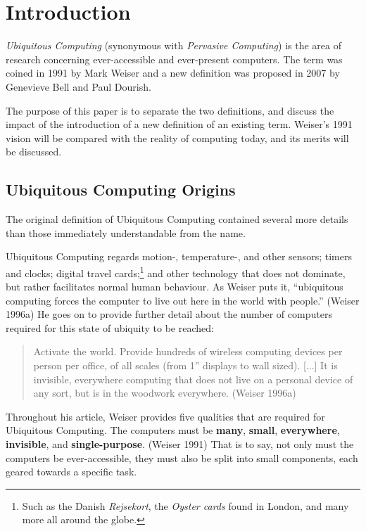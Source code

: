 \section{Introduction}

\emph{Ubiquitous Computing} (synonymous with \emph{Pervasive Computing}) is the area of research concerning
ever-accessible and ever-present computers. The term was coined in 1991 by Mark Weiser and a new definition
was proposed in 2007 by Genevieve Bell and Paul Dourish.

The purpose of this paper is to separate the two definitions, and discuss the impact of the introduction of a
new definition of an existing term. Weiser's 1991 vision will be compared with the reality of computing today,
and its merits will be discussed.

\subsection*{Ubiquitous Computing Origins}

The original definition of Ubiquitous Computing contained several more details than those immediately
understandable from the name.

Ubiquitous Computing regards motion-, temperature-, and other sensors; timers and clocks; digital travel
cards;\footnote{Such as the Danish \emph{Rejsekort}, the \emph{Oyster cards} found in London, and many more
all around the globe.} and other technology that does not dominate, but rather facilitates normal human
behaviour. As Weiser puts it, ``ubiquitous computing forces the computer to live out here in the world with
people.'' (Weiser 1996a) He goes on to provide further detail about the number of computers required for
this state of ubiquity to be reached:

\begin{quote}
     Activate the world. Provide hundreds of wireless computing devices per person per
     office, of all scales (from 1'' displays to wall sized). [...] It is invisible, everywhere computing that does
     not live on a personal device of any sort, but is in the woodwork everywhere. (Weiser 1996a)
\end{quote}

Throughout his article, Weiser provides five qualities that are required for Ubiquitous Computing. The computers must be
\textbf{many}, \textbf{small}, \textbf{everywhere}, \textbf{invisible}, and \textbf{single-purpose}. (Weiser 1991) That is to say,
not only must the computers be ever-accessible, they must also be split into small components, each geared towards
a specific task.

